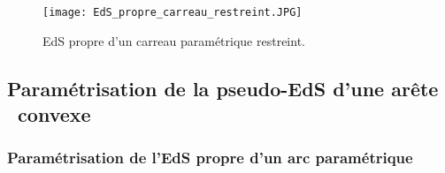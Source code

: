 \begin{figure}
	\centering
	\texttt{[image: EdS\_propre\_carreau\_restreint.JPG]}
	\caption{EdS propre d'un carreau paramétrique restreint.}
	\label{fig:EdS_propre_carreau_restreint}
\end{figure}



\subsection{Paramétrisation de la pseudo-EdS d'une arête \brep\ convexe}%

\subsubsection{Paramétrisation de l'EdS propre d'un arc paramétrique}
\label{section:parametrisation_EdS_propre_courbe}

